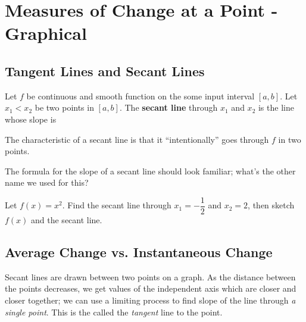 \documentclass[notes]{subfiles}
\begin{document}
	\fancyhead[LO,RE]{\bfseries \small \currentname}
	\fancyfoot[C]{{}}
	\fancyfoot[RO,LE]{\large \thepage}	%


\section*{Measures of Change at a Point - Graphical}\label{cs22}
	\subsection*{Tangent Lines and Secant Lines}
		\begin{defn}
			Let $f$ be continuous and smooth function on the some input interval $[a,b]$.  Let $x_1 < x_2$ be two points in $[a,b]$.  The \textbf{secant line} through $x_1$ and $x_2$ is the line whose slope is 
		\end{defn}
			
		The characteristic of a secant line is that it ``intentionally'' goes through $f$ in two points.  
		
		\begin{question}
			The formula for the slope of a secant line should look familiar; what's the other name we used for this?
		\end{question}
			
		\begin{ex}
			Let $f(x) = x^2$.  Find the secant line through $x_1 = -\dfrac{1}{2}$ and $x_2 = 2$, then sketch $f(x)$ and the secant line.  
		\end{ex}
			
	\subsection*{Average Change vs. Instantaneous Change}
		Secant lines are drawn between two points on a graph.  As the distance between the points decreases, we get values of the independent axis which are closer and closer together; we can use a limiting process to find slope of the line through \emph{a single point}.  This is the called the \emph{tangent} line to the point.
			\vspace{.1in}
			
\end{document}
